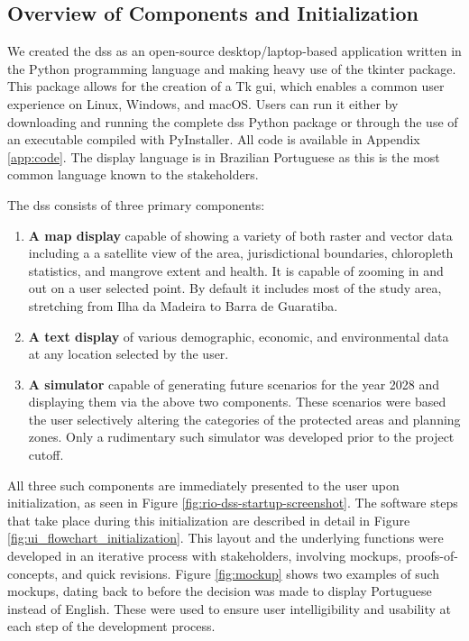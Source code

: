 \subsection{Overview of Components and Initialization}

We created the \ac{dss} as an open-source desktop/laptop-based application written in the Python programming language and making heavy use of the tkinter package. This package allows for the creation of a Tk \ac{gui}, which enables a common user experience on Linux, Windows, and macOS. Users can run it either by downloading and running the complete \ac{dss} Python package or through the use of an executable compiled with PyInstaller. All code is available in Appendix \ref{app:code}. The display language is in Brazilian Portuguese as this is the most common language known to the stakeholders.

The \ac{dss} consists of three primary components:

\begin{enumerate}[label=\emph{\alph*},itemsep=0pt,parsep=0pt]
	\item{\textbf{A map display} capable of showing a variety of both raster and vector data including a a satellite view of the area, jurisdictional boundaries, chloropleth statistics, and mangrove extent and health. It is capable of zooming in and out on a user selected point. By default it includes most of the study area, stretching from Ilha da Madeira to Barra de Guaratiba.}
	\item{\textbf{A text display} of various demographic, economic, and environmental data at any location selected by the user.}
	\item{\textbf{A simulator} capable of generating future scenarios for the year 2028 and displaying them via the above two components. These scenarios were based the user selectively altering the categories of the protected areas and planning zones. Only a rudimentary such simulator was developed prior to the project cutoff.}
\end{enumerate}

All three such components are immediately presented to the user upon initialization, as seen in Figure \ref{fig:rio-dss-startup-screenshot}. The software steps that take place during this initialization are described in detail in Figure \ref{fig:ui_flowchart_initialization}. This layout and the underlying functions were developed in an iterative process with stakeholders, involving mockups, proofs-of-concepts, and quick revisions. Figure \ref{fig:mockup} shows two examples of such mockups, dating back to before the decision was made to display Portuguese instead of English. These were used to ensure user intelligibility and usability at each step of the development process. 

